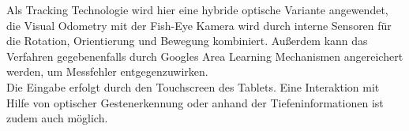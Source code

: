 Als Tracking Technologie wird hier eine hybride optische Variante angewendet, die Visual Odometry mit der Fish-Eye Kamera wird durch interne Sensoren für die Rotation, Orientierung und Bewegung kombiniert. Außerdem kann das Verfahren gegebenenfalls durch Googles Area Learning Mechanismen angereichert werden, um Messfehler entgegenzuwirken. \\

Die Eingabe erfolgt durch den Touchscreen des Tablets. Eine Interaktion mit Hilfe von optischer Gestenerkennung oder anhand der Tiefeninformationen ist zudem auch möglich. \\


